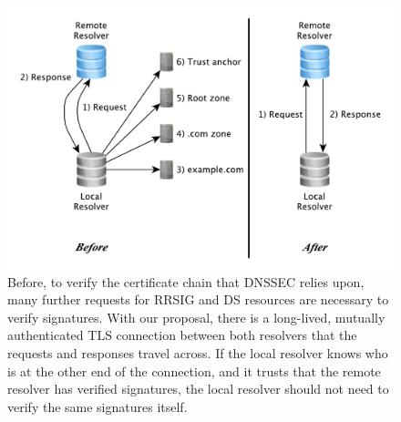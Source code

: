 \begin{figure}
  \centering
  \includegraphics[width=1.0\columnwidth]{figures/before-and-after}
  \caption{Before, to verify the certificate chain that DNSSEC relies upon, many further requests for RRSIG and DS resources are necessary to verify signatures. With our proposal, there is a long-lived, mutually authenticated TLS connection between both resolvers that the requests and responses travel across. If the local resolver knows who is at the other end of the connection, and it trusts that the remote resolver has verified signatures, the local resolver should not need to verify the same signatures itself.}
  \label{fig:before-and-after}
\end{figure}






